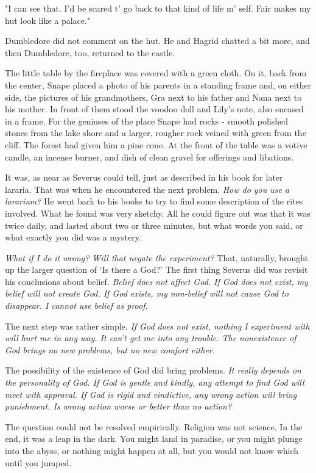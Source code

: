 \documentclass[a4paper,11pt]{article}
\begin{document}
"I can see that. I'd be scared t' go back to that kind of life m' self. Fair makes my hut look like a palace."

Dumbledore did not comment on the hut. He and Hagrid chatted a bit more, and then Dumbledore, too, returned to the castle.

The little table by the fireplace was covered with a green cloth. On it, back from the center, Snape placed a photo of his parents in a standing frame and, on either side, the pictures of his grandmothers, Gra next to his father and Nana next to his mother. In front of them stood the voodoo doll and Lily's note, also encased in a frame. For the geniuses of the place Snape had rocks - smooth polished stones from the lake shore and a larger, rougher rock veined with green from the cliff. The forest had given him a pine cone. At the front of the table was a votive candle, an incense burner, and dish of clean gravel for offerings and libations.

It was, as near as Severus could tell, just as described in his book for later lararia. That was when he encountered the next problem. \emph{How do you use a lararium?} He went back to his books to try to find some description of the rites involved. What he found was very sketchy. All he could figure out was that it was twice daily, and lasted about two or three minutes, but what words you said, or what exactly you did was a mystery.

\emph{What if I do it wrong? Will that negate the experiment?} That, naturally, brought up the larger question of `Is there a God?' The first thing Severus did was revisit his conclusions about belief. \emph{Belief does not affect God. If God does not exist, my belief will not create God. If God exists, my non-belief will not cause God to disappear. I cannot use belief as proof.}

The next step was rather simple. \emph{If God does not exist, nothing I experiment with will hurt me in any way. It can't get me into any trouble. The nonexistence of God brings no new problems, but no new comfort either.}

The possibility of the existence of God did bring problems. \emph{It really depends on the personality of God. If God is gentle and kindly, any attempt to find God will meet with approval. If God is rigid and vindictive, any wrong action will bring punishment. Is wrong action worse or better than no action?}

The question could not be resolved empirically. Religion was not science. In the end, it was a leap in the dark. You might land in paradise, or you might plunge into the abyss, or nothing might happen at all, but you would not know which until you jumped.
\end{document}
